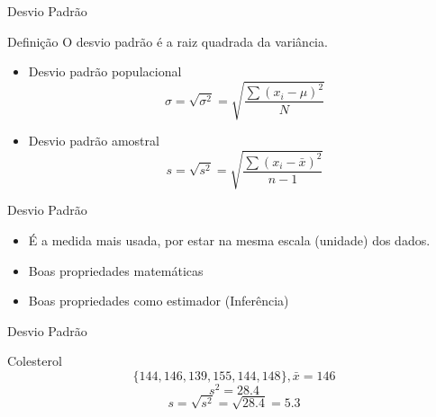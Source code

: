 \documentclass{beamer}
\begin{document}
\begin{frame}{\scriptsize Desvio Padrão}
  \begin{block}{Definição}
    O desvio padrão é a raiz quadrada da variância.
  \end{block}
  \begin{itemize}
    \footnotesize
  \item Desvio padrão populacional
    $$ \sigma = \sqrt{ \sigma^2 } = \sqrt{ \frac{\sum (x_i - \mu)^2}{N} } $$
    \bigskip
  \item Desvio padrão amostral
    $$ s = \sqrt{s^2 } = \sqrt{ \frac{\sum (x_i - \bar{x})^2}{n-1} } $$
  \end{itemize}
\end{frame}

\begin{frame}{\scriptsize Desvio Padrão}
  \begin{itemize}
    \footnotesize
  \item É a medida mais usada, por estar na mesma escala (unidade) dos
    dados.
    \bigskip
  \item Boas propriedades matemáticas
    \bigskip
  \item Boas propriedades como estimador (Inferência)
  \end{itemize}
\end{frame}

\begin{frame}{\scriptsize Desvio Padrão}
  \begin{exampleblock}{Colesterol}
    \scriptsize
      \begin{displaymath}
        \{144, 146, 139, 155, 144, 148\}, \bar{x} = 146
      \end{displaymath}
      \medskip
      \begin{displaymath}
        s^2 = 28.4
      \end{displaymath}
      \medskip
      \begin{displaymath}
        s = \sqrt{s^2} = \sqrt{28.4} = 5.3
    \end{displaymath}
  \end{exampleblock}
\end{frame}
\end{document}
